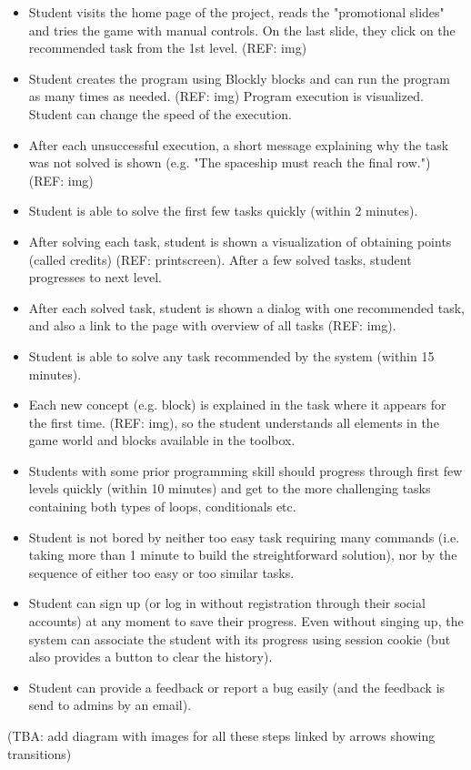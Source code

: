 \begin{itemize}
\item Student visits the home page of the project, reads the "promotional slides" and tries the game with manual controls. On the last slide, they click on the recommended task from the 1st level.
(REF: img)
\item Student creates the program using Blockly blocks and can run the program as many times as needed. (REF: img) Program execution is visualized. Student can change the speed of the execution.
\item After each unsuccessful execution, a short message explaining why the task was not solved is shown (e.g. "The spaceship must reach the final row.") (REF: img)
\item Student is able to solve the first few tasks quickly (within 2 minutes).
\item After solving each task, student is shown a visualization of obtaining points (called credits) (REF: printscreen). After a few solved tasks, student progresses to next level.
\item After each solved task, student is shown a dialog with one recommended task, and also a link to the page with overview of all tasks (REF: img).
\item Student is able to solve any task recommended by the system (within 15 minutes).
\item Each new concept (e.g. block) is explained in the task where it appears for the first time. (REF: img), so the student understands all elements in the game world and blocks available in the toolbox.
\item Students with some prior programming skill should progress through first few levels quickly (within 10 minutes) and get to the more challenging tasks containing both types of loops, conditionals etc.
\item Student is not bored by neither too easy task requiring many commands (i.e. taking more than 1 minute to build the streightforward solution), nor by the sequence of either too easy or too similar tasks.
\item Student can sign up (or log in without registration through their social accounts) at any moment to save their progress. Even without singing up, the system can associate the student with its progress using session cookie (but also provides a button to clear the history).
\item Student can provide a feedback or report a bug easily (and the feedback is send to admins by an email).
\end{itemize}
(TBA: add diagram with images for all these steps linked by arrows showing transitions)


